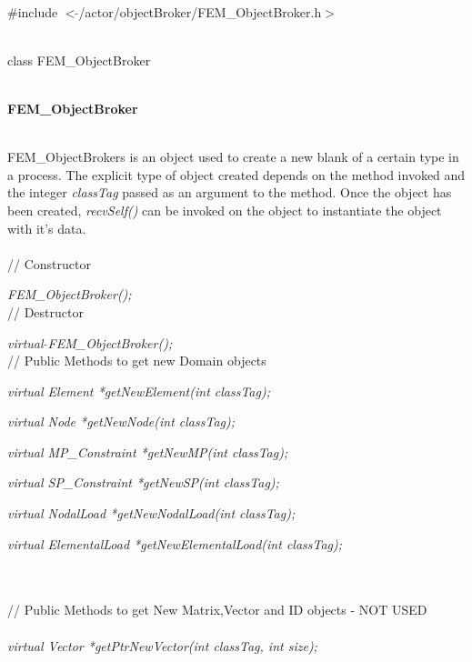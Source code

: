 
   \\
\#include $<\tilde{ }$/actor/objectBroker/FEM\_ObjectBroker.h$>$  


  \\
class FEM\_ObjectBroker 


 \\
{\bf FEM\_ObjectBroker} 


  \\
\indent FEM\_ObjectBrokers is an object used to create a new blank 
of a certain type in a process. The explicit type of object
created depends on the method invoked and the integer {\em classTag}
passed as an argument to the method. Once the object has been created, {\em
recvSelf()} can be invoked on the object to instantiate the object
with it's data. \\


  \\
// Constructor  

{\em FEM\_ObjectBroker();}  \\

// Destructor 

{\em virtual $\tilde{ }$FEM\_ObjectBroker();}\\  

// Public Methods to get new Domain objects 

{\em virtual Element       *getNewElement(int classTag); } 

{\em virtual Node          *getNewNode(int classTag); } 

{\em virtual MP\_Constraint *getNewMP(int classTag); } 

{\em virtual SP\_Constraint *getNewSP(int classTag); } 

{\em virtual NodalLoad     *getNewNodalLoad(int classTag); } 

{\em virtual ElementalLoad *getNewElementalLoad(int classTag); } 

 \\  \\
\indent // Public Methods to get New Matrix,Vector and ID objects -
NOT USED \\
 \\ 
{\em virtual Vector	  *getPtrNewVector(int classTag, int size); } 

